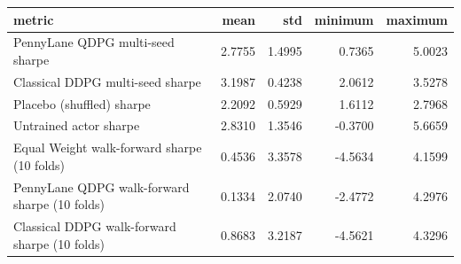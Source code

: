 \begin{tabular}{lrrrr}
\toprule
metric & mean & std & minimum & maximum \\
\midrule
PennyLane QDPG multi-seed sharpe & 2.7755 & 1.4995 & 0.7365 & 5.0023 \\
Classical DDPG multi-seed sharpe & 3.1987 & 0.4238 & 2.0612 & 3.5278 \\
Placebo (shuffled) sharpe & 2.2092 & 0.5929 & 1.6112 & 2.7968 \\
Untrained actor sharpe & 2.8310 & 1.3546 & -0.3700 & 5.6659 \\
Equal Weight walk-forward sharpe (10 folds) & 0.4536 & 3.3578 & -4.5634 & 4.1599 \\
PennyLane QDPG walk-forward sharpe (10 folds) & 0.1334 & 2.0740 & -2.4772 & 4.2976 \\
Classical DDPG walk-forward sharpe (10 folds) & 0.8683 & 3.2187 & -4.5621 & 4.3296 \\
\bottomrule
\end{tabular}
